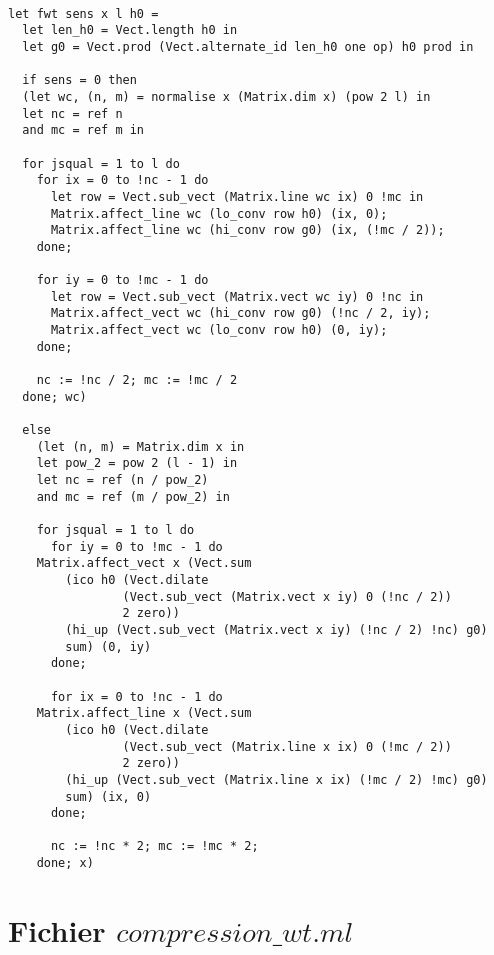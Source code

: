 \documentclass[a4paper,10pt]{report}
\theoremstyle{break}
\begin{document}
\newpage
    \begin{lstlisting}

let fwt sens x l h0 =
  let len_h0 = Vect.length h0 in 
  let g0 = Vect.prod (Vect.alternate_id len_h0 one op) h0 prod in

  if sens = 0 then
  (let wc, (n, m) = normalise x (Matrix.dim x) (pow 2 l) in
  let nc = ref n
  and mc = ref m in

  for jsqual = 1 to l do
    for ix = 0 to !nc - 1 do
      let row = Vect.sub_vect (Matrix.line wc ix) 0 !mc in
      Matrix.affect_line wc (lo_conv row h0) (ix, 0);
      Matrix.affect_line wc (hi_conv row g0) (ix, (!mc / 2));
    done;

    for iy = 0 to !mc - 1 do
      let row = Vect.sub_vect (Matrix.vect wc iy) 0 !nc in
      Matrix.affect_vect wc (hi_conv row g0) (!nc / 2, iy);
      Matrix.affect_vect wc (lo_conv row h0) (0, iy);
    done;

    nc := !nc / 2; mc := !mc / 2
  done; wc)

  else
    (let (n, m) = Matrix.dim x in
    let pow_2 = pow 2 (l - 1) in
    let nc = ref (n / pow_2)
    and mc = ref (m / pow_2) in

    for jsqual = 1 to l do
      for iy = 0 to !mc - 1 do
	Matrix.affect_vect x (Vect.sum 
		(ico h0 (Vect.dilate 
			    (Vect.sub_vect (Matrix.vect x iy) 0 (!nc / 2)) 
			    2 zero)) 
		(hi_up (Vect.sub_vect (Matrix.vect x iy) (!nc / 2) !nc) g0) 
		sum) (0, iy)
      done;

      for ix = 0 to !nc - 1 do
	Matrix.affect_line x (Vect.sum 
		(ico h0 (Vect.dilate 
			    (Vect.sub_vect (Matrix.line x ix) 0 (!mc / 2)) 
			    2 zero)) 
		(hi_up (Vect.sub_vect (Matrix.line x ix) (!mc / 2) !mc) g0) 
		sum) (ix, 0)
      done;

      nc := !nc * 2; mc := !mc * 2;
    done; x)

    \end{lstlisting}

\newpage
    
  \section*{Fichier $compression\_wt.ml$}
  
\end{document}
